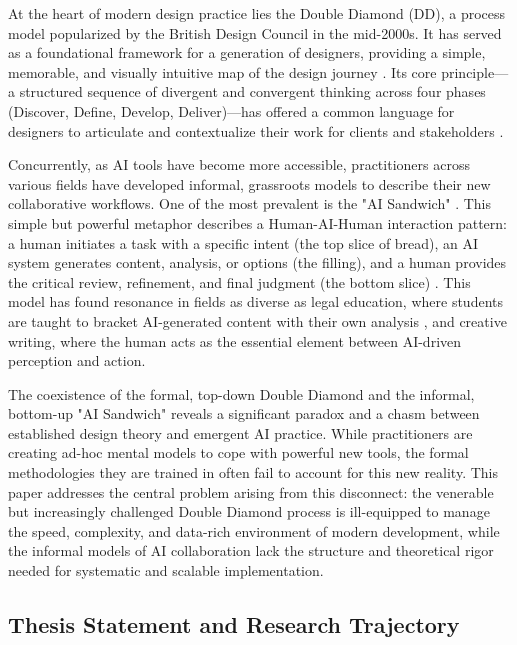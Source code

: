 \documentclass[
  12pt,
  a4paper,
  bibliography=totoc,
  numbers=noenddot
]{scrartcl}
\begin{document}
At the heart of modern design practice lies the Double Diamond (DD), a
process model popularized by the British Design Council in the
mid-2000s.\cite{wikipedia2025double1} It has served as a foundational framework
for a generation of designers, providing a simple, memorable, and
visually intuitive map of the design journey \cite{designcouncil2025history}. Its
core principle---a structured sequence of divergent and convergent
thinking across four phases (Discover, Define, Develop, Deliver)---has
offered a common language for designers to articulate and contextualize
their work for clients and stakeholders \cite{wikipedia2025double2}.

Concurrently, as AI tools have become more accessible, practitioners
across various fields have developed informal, grassroots models to
describe their new collaborative workflows. One of the most prevalent is
the "AI Sandwich" \cite{nationaljurist2025ai}. This simple but powerful metaphor
describes a Human-AI-Human interaction pattern: a human initiates a task
with a specific intent (the top slice of bread), an AI system generates
content, analysis, or options (the filling), and a human provides the
critical review, refinement, and final judgment (the bottom
slice) \cite{nationaljurist2025ai}. This model has found resonance in fields as
diverse as legal education, where students are taught to bracket
AI-generated content with their own analysis \cite{nationaljurist2025ai}, and
creative writing, where the human acts as the essential element between
AI-driven perception and action.\cite{medium2025symbiotic}

The coexistence of the formal, top-down Double Diamond and the informal,
bottom-up "AI Sandwich" reveals a significant paradox and a chasm
between established design theory and emergent AI practice. While
practitioners are creating ad-hoc mental models to cope with powerful
new tools, the formal methodologies they are trained in often fail to
account for this new reality. This paper addresses the central problem
arising from this disconnect: the venerable but increasingly challenged
Double Diamond process is ill-equipped to manage the speed, complexity,
and data-rich environment of modern development, while the informal
models of AI collaboration lack the structure and theoretical rigor
needed for systematic and scalable implementation.

\subsection{Thesis Statement and Research
Trajectory}\label{thesis-statement-and-research-trajectory}
\end{document}

